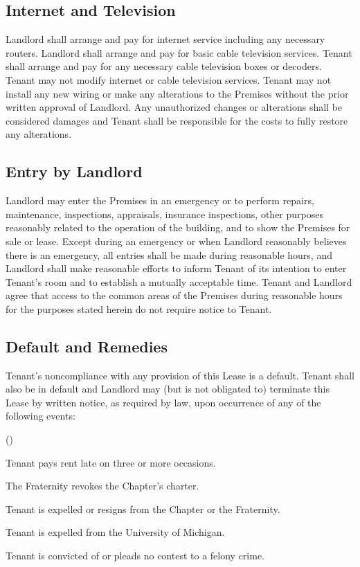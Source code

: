 \documentclass{article}
\begin{document}
\subsection{Internet and Television}
Landlord shall arrange and pay for internet service including any necessary
routers. Landlord shall arrange and pay for basic cable television services.
Tenant shall arrange and pay for any necessary cable television boxes or
decoders. Tenant may not modify internet or cable television services. Tenant
may not install any new wiring or make any alterations to the Premises without
the prior written approval of Landlord. Any unauthorized changes or alterations
shall be considered damages and Tenant shall be responsible for the costs to
fully restore any alterations.

\subsection{Entry by Landlord}
Landlord may enter the Premises in an emergency or to perform repairs,
maintenance, inspections, appraisals, insurance inspections, other purposes
reasonably related to the operation of the building, and to show the Premises
for sale or lease. Except during an emergency or when Landlord reasonably
believes there is an emergency, all entries shall be made during reasonable
hours, and Landlord shall make reasonable efforts to inform Tenant of its
intention to enter Tenant’s room and to establish a mutually acceptable time.
Tenant and Landlord agree that access to the common areas of the Premises during
reasonable hours for the purposes stated herein do not require notice to
Tenant.

\subsection{Default and Remedies}\label{Default and Remedies}
Tenant’s noncompliance with any provision of this Lease is a default. Tenant
shall also be in default and Landlord may (but is not obligated to) terminate
this Lease by written notice, as required by law, upon occurrence of any of the
following events:

\begin{compactList}{()}{}
  \item Tenant pays rent late on three or more occasions.
  \item The Fraternity revokes the Chapter’s charter.
  \item Tenant is expelled or resigns from the Chapter or the Fraternity.
  \item Tenant is expelled from the University of Michigan.
  \item Tenant is convicted of or pleads no contest to a felony crime.
\end{compactList}
\end{document}
